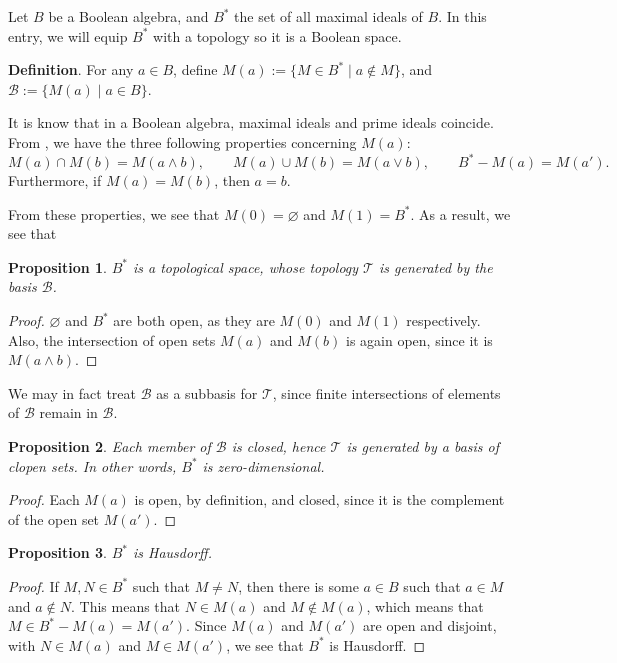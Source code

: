 \documentclass[12pt]{article}
\newtheorem{prop}{Proposition}
\begin{document}
Let $B$ be a Boolean algebra, and $B^*$ the set of all maximal ideals of $B$.  In this entry, we will equip $B^*$ with a topology so it is a Boolean space.

\textbf{Definition}.  For any $a\in B$, define $M(a):=\lbrace M\in B^* \mid a\notin M\rbrace$, and $\mathcal{B}:=\lbrace M(a)\mid a\in B\rbrace$.

It is know that in a Boolean algebra, maximal ideals and prime ideals coincide.  From , we have the three following properties concerning $M(a)$:
$$M(a)\cap M(b)=M(a\wedge b), \qquad M(a)\cup M(b)=M(a\vee b), \qquad B^*-M(a)=M(a').$$
Furthermore, if $M(a)=M(b)$, then $a=b$.

From these properties, we see that $M(0)=\varnothing$ and $M(1)=B^*$.  As a result, we see that
\begin{prop} $B^*$ is a topological space, whose topology $\mathcal{T}$ is generated by the basis $\mathcal{B}$. \end{prop}
\begin{proof} $\varnothing$ and $B^*$ are both open, as they are $M(0)$ and $M(1)$ respectively.  Also, the intersection of open sets $M(a)$ and $M(b)$ is again open, since it is $M(a\wedge b)$. \end{proof}

We may in fact treat $\mathcal{B}$ as a subbasis for $\mathcal{T}$, since finite intersections of elements of $\mathcal{B}$ remain in $\mathcal{B}$.

\begin{prop} Each member of $\mathcal{B}$ is closed, hence $\mathcal{T}$ is generated by a basis of clopen sets.  In other words, $B^*$ is zero-dimensional.  \end{prop}
\begin{proof} Each $M(a)$ is open, by definition, and closed, since it is the complement of the open set $M(a')$.  \end{proof}

\begin{prop} $B^*$ is Hausdorff.  \end{prop}
\begin{proof} If $M,N\in B^*$ such that $M\ne N$, then there is some $a\in B$ such that $a\in M$ and $a\notin N$.  This means that $N\in M(a)$ and $M\notin M(a)$, which means that $M\in B^*-M(a)=M(a')$.  Since $M(a)$ and $M(a')$ are open and disjoint, with $N\in M(a)$ and $M\in M(a')$, we see that $B^*$ is Hausdorff. \end{proof}
\end{document}
